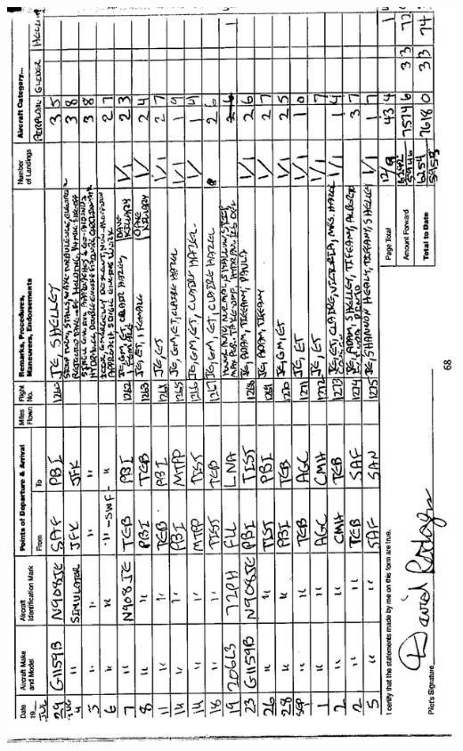 \documentclass[10pt]{article}
\begin{document}
\begin{center}
\includegraphics[max width=\textwidth]{2025_02_27_dd68c3d38de88f0516d9g-072}
\end{center}
\end{document}
